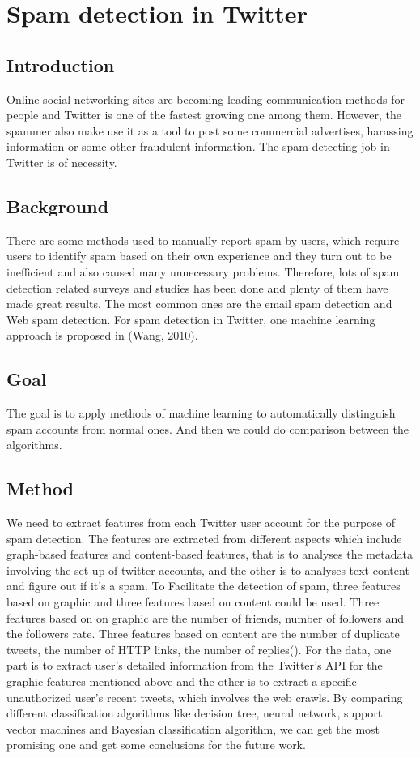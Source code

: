 \documentclass[../proposal.tex]{subfiles}
\begin{document}
\section{Spam detection in Twitter}
 
\subsection{Introduction}
Online social networking sites are becoming leading communication methods for people and Twitter is one of the fastest growing one among them. However, the spammer also make use it as a tool to post some commercial advertises, harassing information or some other fraudulent information. The spam detecting job in Twitter is of necessity.

\subsection{Background}
There are some methods used to manually report spam by users, which require users to identify spam based on their own experience and they turn out to be inefficient and also caused many unnecessary problems. Therefore, lots of spam detection related surveys and studies has been done and plenty of them have made great results. The most common ones are the email spam detection and Web spam detection. For spam detection in Twitter, one machine learning approach is proposed in (Wang, 2010).

\subsection{Goal}
The goal is to apply methods of machine learning to automatically distinguish spam accounts from normal ones. And then we could do comparison between the algorithms. 

\subsection{Method}
We need to extract features from each Twitter user account for the purpose of spam detection. The features are extracted from different aspects which include graph-based features and content-based features, that is to analyses the metadata involving the set up of twitter accounts, and the other is to analyses text content and figure out if it’s a spam. To Facilitate the detection of spam,  three features based on graphic and three features based on content could be used. Three features based on on graphic are the number of friends, number of followers and the followers rate. Three features based on content are the number of duplicate tweets, the number of HTTP links, the number of replies(\cite{wang2010don}). For the data, one part is to extract user's detailed information from the Twitter's API for the graphic features mentioned above and the other is to extract a specific unauthorized user's recent tweets, which involves the web crawls. By comparing different classification algorithms like decision tree, neural network, support vector machines and Bayesian classification algorithm, we can get the most promising one and get some conclusions for the future work.
\end{document}
